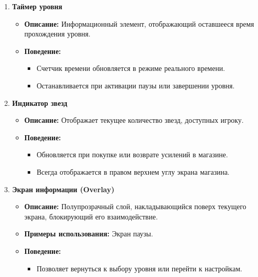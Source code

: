 \documentclass{article}
\begin{document}
\begin{enumerate}
    \item \textbf{Таймер уровня}
    \begin{itemize}
        \item \textbf{Описание:} Информационный элемент, отображающий оставшееся время прохождения уровня.
        \item \textbf{Поведение:}
        \begin{itemize}
            \item Счетчик времени обновляется в режиме реального времени.
            \item Останавливается при активации паузы или завершении уровня.
        \end{itemize}
    \end{itemize}

    \item \textbf{Индикатор звезд}
    \begin{itemize}
        \item \textbf{Описание:} Отображает текущее количество звезд, доступных игроку.
        \item \textbf{Поведение:}
        \begin{itemize}
            \item Обновляется при покупке или возврате усилений в магазине.
            \item Всегда отображается в правом верхнем углу экрана магазина.
        \end{itemize}
    \end{itemize}

    \item \textbf{Экран информации (Overlay)}
    \begin{itemize}
        \item \textbf{Описание:} Полупрозрачный слой, накладывающийся поверх текущего экрана, блокирующий его взаимодействие.
        \item \textbf{Примеры использования:} Экран паузы.
        \item \textbf{Поведение:}
        \begin{itemize}
            \item Позволяет вернуться к выбору уровня или перейти к настройкам.
        \end{itemize}
    \end{itemize}
\end{enumerate}
\end{document}
